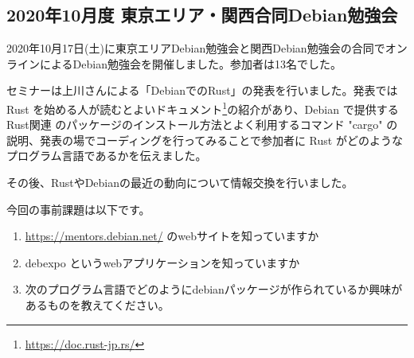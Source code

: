 \documentclass[mingoth,a4paper]{jsarticle}
\begin{document}

\subsection{2020年10月度 東京エリア・関西合同Debian勉強会}

2020年10月17日(土)に東京エリアDebian勉強会と関西Debian勉強会の合同でオンラインによるDebian勉強会を開催しました。参加者は13名でした。

セミナーは上川さんによる「DebianでのRust」の発表を行いました。発表では Rust を始める人が読むとよいドキュメント\footnote{\url{https://doc.rust-jp.rs/}}の紹介があり、Debian で提供する Rust関連 のパッケージのインストール方法とよく利用するコマンド "cargo" の説明、発表の場でコーディングを行ってみることで参加者に Rust がどのようなプログラム言語であるかを伝えました。

その後、RustやDebianの最近の動向について情報交換を行いました。


今回の事前課題は以下です。

\begin{enumerate}
\item \url{https://mentors.debian.net/} のwebサイトを知っていますか
\item debexpo というwebアプリケーションを知っていますか
\item 次のプログラム言語でどのようにdebianパッケージが作られているか興味があるものを教えてください。
\end{enumerate}


\begin{multicols}{2}
{\small

}
\end{multicols}

%
%
%
%




\end{document}
